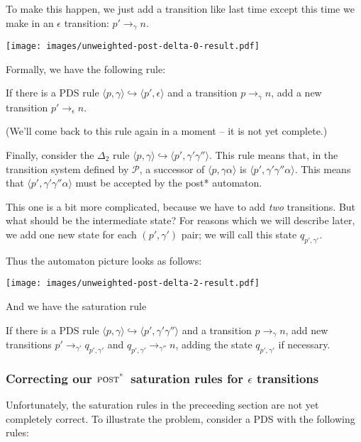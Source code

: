 \documentclass{article}
\newcommand{\Config}[2]{\ensuremath{\langle #1, #2 \rangle}}
\newcommand{\Rule}[2]{\ensuremath{#1 \hookrightarrow #2}}
\newcommand{\Trans}[3]{\ensuremath{#1 \rightarrow_{#2} #3}}
\newcommand{\poststar}{\ensuremath{\textsc{post}^\textsc{*}}}
\begin{document}
To make this happen, we just add a transition like last time except
this time we make in an $\epsilon$ transition:
$\Trans{p'}{\gamma}{n}$.\\
\begin{center}
  \texttt{[image: images/unweighted-post-delta-0-result.pdf]}
\end{center}


Formally, we have the following rule:

   If there is a PDS rule
   \Rule{\Config{p}{\gamma}}{\Config{p'}{\epsilon}} and a transition
   \Trans{p}{\gamma}{n}, add a new transition
   \Trans{p'}{\epsilon}{n}.

(We'll come back to this rule again in a moment -- it is not yet
complete.)

Finally, consider the $\Delta_2$ rule
\Rule{\Config{p}{\gamma}}{\Config{p'}{\gamma'\gamma''}}. This rule
means that, in the transition system defined by $\mathcal{P}$, a
successor of \Config{p}{\gamma\alpha} is
\Config{p'}{\gamma'\gamma''\alpha}. This means that
\Config{p'}{\gamma'\gamma''\alpha} must be accepted by the post*
automaton.

This one is a bit more complicated, because we have to add \emph{two}
transitions. But what should be the intermediate state? For reasons
which we will describe later, we add one new state for each
$(p',\gamma')$ pair; we will call this state $q_{p',\gamma'}$.

Thus the automaton picture looks as follows:
\begin{center}
  \texttt{[image: images/unweighted-post-delta-2-result.pdf]}
\end{center}

And we have the saturation rule

   If there is a PDS rule
   \Rule{\Config{p}{\gamma}}{\Config{p'}{\gamma'\gamma''}} and a
   transition \Trans{p}{\gamma}{n}, add new transitions
   \Trans{p'}{\gamma'}{q_{p',\gamma'}} and
   \Trans{q_{p',\gamma'}}{\gamma''}{n}, adding the state $q_{p',\gamma'}$
   if necessary.


\subsubsection{Correcting our \poststar\ saturation rules for $\epsilon$
  transitions}

Unfortunately, the saturation rules in the preceeding section are not
yet completely correct. To illustrate the problem, consider a PDS with
the following rules:
\end{document}
